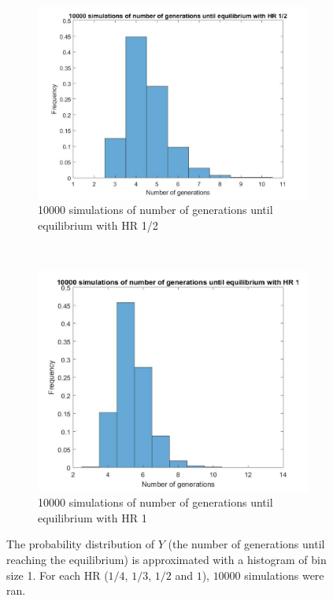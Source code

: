 \begin{figure}[H]
\begin{subfigure}{0.45\textwidth}
        \label{hist hap 1/3}
    \end{subfigure}
	~
    \begin{subfigure}{0.45\textwidth}
        \includegraphics[width=\textwidth]{GenormHistogramAantalgen2.pdf}
        \caption{10000 simulations of number of generations until equilibrium with HR 1/2}
        \label{hist hap 1/2}
    \end{subfigure}
    ~
    \begin{subfigure}{0.45\textwidth}
        \includegraphics[width=\textwidth]{GenormHistogramAantalgen1.pdf}
        \caption{10000 simulations of number of generations until equilibrium with HR 1}
        \label{hist hap 1}
    \end{subfigure}
    \caption{The probability distribution of $Y$ (the number of generations until reaching the equilibrium) is approximated with a histogram of bin size 1. 
    For each HR ($1/4$, $1/3$, $1/2$ and $1$), $10000$ simulations were ran.}
    \label{fig:histogram}
\end{figure}

